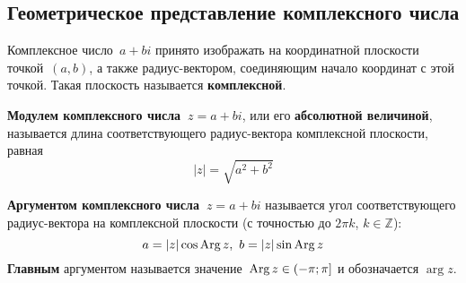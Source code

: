 \subsection{Геометрическое представление комплексного числа}
Комплексное число~$a + bi$ принято изображать на координатной плоскости точкой~$(a, b)$, а также радиус-вектором, соединяющим начало координат с этой точкой.
Такая плоскость называется \textbf{комплексной}.

\textbf{Модулем комплексного числа~$z = a + bi$}, или его \textbf{абсолютной величиной}, называется длина соответствующего радиус-вектора комплексной плоскости, равная
\begin{equation*}
|z| = \sqrt{a^2 + b^2}
\end{equation*}

 \textbf{Аргументом комплексного числа~$z = a + bi$} называется угол соответствующего радиус-вектора на комплексной плоскости (с точностью до $2\pi k$, $k \in \mathbb Z$):
\begin{equation*}
a = |z| \cos \operatorname{Arg} z, \ b = |z| \sin \operatorname{Arg} z
\end{equation*}
 \textbf{Главным} аргументом называется значение~$\operatorname{Arg} z \in (-\pi; \pi]$ и обозначается $\arg z$.